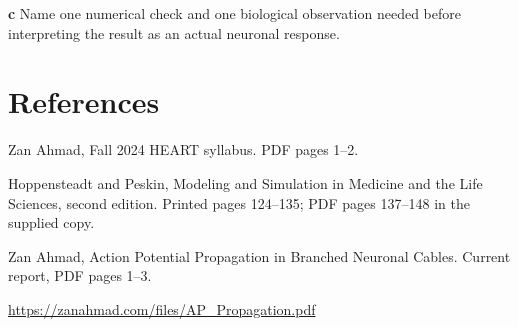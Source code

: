\documentclass[11pt,letterpaper]{article}
\theoremstyle{definition}\newtheorem{definition}{Definition}\newtheorem{example}{Example}
\numberwithin{equation}{section}
\begin{document}
\textbf{c} Name one numerical check and one biological observation needed before interpreting the result as an actual neuronal response.

\section*{References}
\noindent\begin{minipage}{\linewidth}
Zan Ahmad, Fall 2024 HEART syllabus. PDF pages 1--2.

\end{minipage}\par\medskip
\noindent\begin{minipage}{\linewidth}
Hoppensteadt and Peskin, Modeling and Simulation in Medicine and the Life Sciences, second edition. Printed pages 124--135; PDF pages 137--148 in the supplied copy.

\end{minipage}\par\medskip
\noindent\begin{minipage}{\linewidth}
Zan Ahmad, Action Potential Propagation in Branched Neuronal Cables. Current report, PDF pages 1--3.

\url{https://zanahmad.com/files/AP_Propagation.pdf}
\end{minipage}\par\medskip
\end{document}

